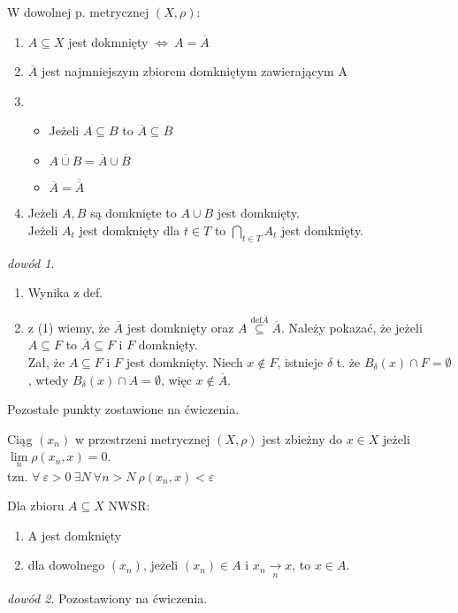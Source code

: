 \documentclass[twoside,10pt]{article}
\theoremstyle{definition}
\theoremstyle{definition}
\theoremstyle{definition}
\theoremstyle{definition}
\theoremstyle{remark}
\newtheorem*{dd}{dowód}
\theoremstyle{definition}
\theoremstyle{definition}
\theoremstyle{definition}
\theoremstyle{definition}
\theoremstyle{definition}
\theoremstyle{definition}
\begin{document}
\begin{tw} 
    W dowolnej p. metrycznej $(X,\rho)$: 
    \begin{enumerate}[(1)]
        \item $A \subseteq X$ jest dokmnięty $\Leftrightarrow \ A = \overline{A}$ 
        \item $\overline{A}$ jest najmniejszym zbiorem domkniętym zawierającym A
        \item \begin{itemize}
            \item Jeżeli $A \subseteq B$ to $\overline{A} \subseteq \overline{B}$ 
            \item $\overline{A \cup B} = \overline{A} \cup \overline{B}$ 
            \item $\overline{A} = \overline{\overline{A}}$
            \end{itemize}
        \item Jeżeli $A,B$ są domknięte to $A \cup B$ jest domknięty. \\ 
            Jeżeli $A_t$ jest domknięty dla $t \in T$ to $\bigcap\limits_{t \in T} A_t$ jest domknięty.
    \end{enumerate}
\end{tw} 
\begin{dd} \hfill
    \begin{enumerate}[(1)] 
        \item Wynika z def.
        \item z (1) wiemy, że $\overline{A}$ jest domknięty oraz $A \overset{\text{def} \overline{A}}{\subseteq} \overline{A}$. Należy pokazać, że jeżeli $A \subseteq F$ to $\overline{A} \subseteq F$ i $F$ domknięty. \\ 
        Zał, że $A \subseteq F$ i $F$ jest domknięty. Niech $x \notin F$, istnieje $\delta$ t. że $B_\delta (x) \cap F = \emptyset$, wtedy $B_\delta (x) \cap A = \emptyset$, więc $x \notin \overline{A}$. 
    \end{enumerate}
    Pozostałe punkty zostawione na ćwiczenia. 
\end{dd} 

\begin{df} 
    Ciąg $(x_n)$ w przestrzeni metrycznej $(X,\rho)$ jest zbieżny do $x \in X$ jeżeli $\lim\limits_n \rho(x_n,x) = 0$.\\
    tzn. $\forall \ \varepsilon > 0 \ \exists N \ \forall n > N \ \rho(x_n,x) < \varepsilon$
\end{df} 

\begin{tw} 
    Dla zbioru $A \subseteq X$ NWSR: 
    \begin{enumerate}[(1)]
        \item A jest domknięty 
        \item dla dowolnego $(x_n)$, jeżeli $(x_n) \in A$ i $x_n \underset{n}{\rightarrow} x$, to $x \in A$.
    \end{enumerate} 
\end{tw} 
\begin{dd} Pozostawiony na ćwiczenia. \end{dd}
\end{document}
